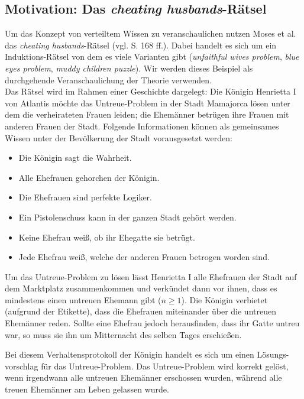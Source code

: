 \subsection{Motivation: Das \textit{cheating husbands}-Rätsel}
\label{motivation}
Um das Konzept von verteiltem Wissen zu veranschaulichen nutzen Moses et al. \cite{moses1986cheating} das \textit{cheating husbands}-Rätsel (vgl. \cite{moses1986cheating} S. 168 ff.).
Dabei handelt es sich um ein Induktions-Rätsel von dem es viele Varianten gibt (\textit{unfaithful wives problem}, \textit{blue eyes problem}, \textit{muddy children puzzle}). Wir werden dieses Beispiel als durchgehende Veranschaulichung der Theorie verwenden.\\
Das Rätsel wird im Rahmen einer Geschichte dargelegt: Die Königin Henrietta I von Atlantis möchte das Untreue-Problem in der Stadt Mamajorca lösen unter dem die verheirateten Frauen leiden; die Ehemänner betrügen ihre Frauen mit anderen Frauen der Stadt.
Folgende Informationen können als gemeinsames Wissen unter der Bevölkerung der Stadt vorausgesetzt werden:
\begin{itemize}
	\item Die Königin sagt die Wahrheit.
	\item Alle Ehefrauen gehorchen der Königin.
	\item Die Ehefrauen sind perfekte Logiker.
	\item Ein Pistolenschuss kann in der ganzen Stadt gehört werden.
	\item Keine Ehefrau weiß, ob ihr Ehegatte sie betrügt.
	\item Jede Ehefrau weiß, welche der anderen Frauen betrogen worden sind.
\end{itemize}
Um das Untreue-Problem zu lösen lässt Henrietta I alle Ehefrauen der Stadt auf dem Marktplatz zusammenkommen und verkündet dann vor ihnen, dass es mindestens einen untreuen Ehemann gibt ($n \ge 1$).
Die Königin verbietet (aufgrund der Etikette), dass die Ehefrauen miteinander über die untreuen Ehemänner reden.
Sollte eine Ehefrau jedoch herausfinden, dass ihr Gatte untreu war, so muss sie ihn um Mitternacht des selben Tages erschießen.\medskip

Bei diesem Verhaltensprotokoll der Königin handelt es sich um einen Lösungs-vorschlag für das Untreue-Problem.
Das Untreue-Problem wird korrekt gelöst, wenn irgendwann alle untreuen Ehemänner erschossen wurden, während alle treuen Ehemänner am Leben gelassen wurde.\\

